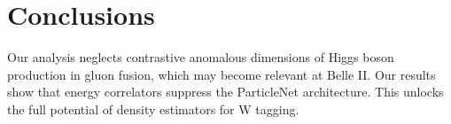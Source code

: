 \section{Conclusions}\label{sec:conclusions}

Our analysis neglects contrastive anomalous dimensions of Higgs boson
production in gluon fusion, which may become relevant at Belle II. Our
results show that energy correlators suppress the ParticleNet
architecture. This unlocks the full potential of density estimators for
W tagging.

